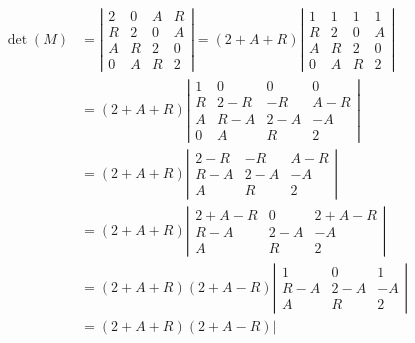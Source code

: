 \documentclass[../../main.tex]{subfiles}
\begin{document}
  \begin{equation*}
    \begin{split}
      \det{(M)} & = \left|
        \begin{matrix}
          2 & 0 & A & R \\
          R & 2 & 0 & A \\
          A & R & 2 & 0 \\
          0 & A & R & 2
        \end{matrix}
      \right| = (2 + A + R) \left|
        \begin{matrix}
          1 & 1 & 1 & 1 \\
          R & 2 & 0 & A \\
          A & R & 2 & 0 \\
          0 & A & R & 2
        \end{matrix}
      \right| \\ & = (2 + A + R) \left|
        \begin{matrix}
          1 &   0   &   0   &   0   \\
          R & 2 - R &  - R  & A - R \\
          A & R - A & 2 - A &  - A  \\
          0 &   A   &   R   &   2
        \end{matrix}
      \right| \\ & = (2 + A + R) \left|
        \begin{matrix}
          2 - R &  - R  & A - R \\
          R - A & 2 - A &  - A  \\
            A   &   R   &   2
        \end{matrix}
      \right| \\ & = (2 + A + R) \left|
        \begin{matrix}
          2 + A - R &   0   & 2 + A - R \\
            R - A   & 2 - A &    - A    \\
              A     &   R   &     2
        \end{matrix}
      \right| \\ & = (2 + A + R)(2 + A - R) \left|
        \begin{matrix}
            1   &   0   &  1  \\
          R - A & 2 - A & - A \\
            A   &   R   &  2
        \end{matrix}
      \right| \\ & = (2 + A + R)(2 + A - R) \left|

\end{split}
\end{equation*}
\end{document}
